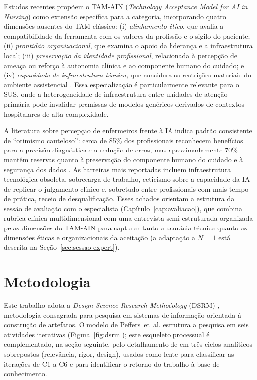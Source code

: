 \documentclass[
  12pt,
  oneside,
  a4paper,
  english,
  brazil
]{abntex2}
\begin{document}
Estudos recentes propõem o TAM-AIN (\textit{Technology Acceptance Model for AI in
Nursing}) como extensão específica para a categoria, incorporando quatro dimensões
ausentes do TAM clássico: (i) \textit{alinhamento ético}, que avalia a compatibilidade
da ferramenta com os valores da profissão e o sigilo do paciente; (ii) \textit{prontidão
organizacional}, que examina o apoio da liderança e a infraestrutura local;
(iii) \textit{preservação da identidade profissional}, relacionada à percepção de
ameaça ou reforço à autonomia clínica e ao componente humano do cuidado; e
(iv) \textit{capacidade de infraestrutura técnica}, que considera as restrições
materiais do ambiente assistencial \cite{nursingTAM2024}. Essa especialização é
particularmente relevante para o SUS, onde a heterogeneidade de infraestrutura entre
unidades de atenção primária pode invalidar premissas de modelos genéricos derivados
de contextos hospitalares de alta complexidade.

A literatura sobre percepção de enfermeiros frente à IA indica padrão consistente de
``otimismo cauteloso'': cerca de 85\% dos profissionais reconhecem benefícios para a
precisão diagnóstica e a redução de erros, mas aproximadamente 70\% mantêm reservas
quanto à preservação do componente humano do cuidado e à segurança dos dados
\cite{nursingTAM2024}. As barreiras mais reportadas incluem infraestrutura tecnológica
obsoleta, sobrecarga de trabalho, ceticismo sobre a capacidade da IA de replicar o
julgamento clínico e, sobretudo entre profissionais com mais tempo de prática, receio
de desqualificação. Esses achados orientam a estrutura da sessão de avaliação com o
especialista (Capítulo~\ref{cap:avaliacao}), que combina rubrica clínica
multidimensional com uma entrevista semi-estruturada organizada pelas dimensões
do TAM-AIN para capturar tanto a acurácia técnica quanto as dimensões éticas e
organizacionais da aceitação (a adaptação a $N=1$ está descrita na
Seção~\ref{sec:sessao-expert}).

\chapter{Metodologia}
\label{cap:metodologia}

Este trabalho adota a \textit{Design Science Research Methodology}
(DSRM) \cite{peffers2007}, metodologia consagrada para pesquisa em
sistemas de informação orientada à construção de artefatos. O modelo
de Peffers~et~al. estrutura a pesquisa em seis atividades iterativas
(Figura~\ref{fig:dsrm}); este esqueleto processual é complementado, na
seção seguinte, pelo detalhamento de \citeauthor{hevner2007}
\cite{hevner2007} em três ciclos analíticos sobrepostos
(relevância, rigor, design), usados como lente para classificar as
iterações de C1 a C6 e para identificar o retorno do trabalho à base
de conhecimento.
\end{document}
